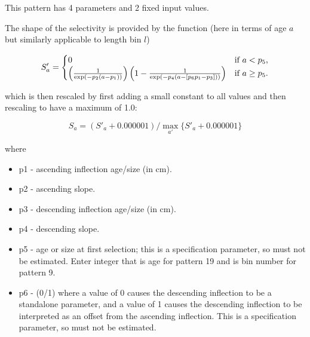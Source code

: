 
This pattern has 4 parameters and 2 fixed input values.

The shape of the selectivity is provided by the function (here in terms of age $a$ but similarly applicable to length bin $l$)

\begin{equation}
    S'_a =  
    \begin{cases}
      \hfil 0 & \text{if $a < p_5$,} \\
      \left( \frac{1}{\exp\left(-p_2 \left( a - p_1 \right) \right) } \right)
      \left(1 - \frac{1}{\exp\left(-p_4 \left( a - [p_6 p_1 - p_3]\right) \right) } \right)
      & \text{if $a \geq p_5$.}
    \end{cases}
 \end{equation}

 which is then rescaled by first adding a small constant to all values and then rescaling to have a maximum of 1.0:
 
 \begin{equation}
    S_a = (S'_a + 0.000001) / \max_{a'}\{S'_a + 0.000001\}
 \end{equation}

  where
	\begin{itemize}
		\item p1 - ascending inflection age/size (in cm).
		\item p2 - ascending slope. 
		\item p3 - descending inflection age/size (in cm).
		\item p4 - descending slope.
		\item p5 - age or size at first selection; this is a specification parameter, so must not be estimated. Enter integer that is age for pattern 19 and is bin number for pattern 9.
		\item p6 - (0/1) where a value of 0 causes the descending inflection to be a standalone parameter, and a value of 1 causes the descending inflection to be interpreted as an offset from the ascending inflection. This is a specification parameter, so must not be estimated.
	\end{itemize}

